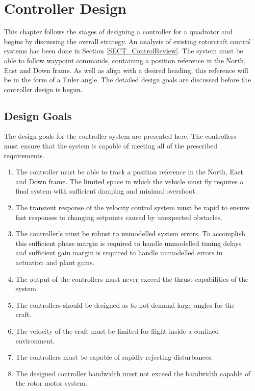 \chapter{Controller Design}
This chapter follows the stages of designing a controller for a quadrotor and begins by discussing the overall strategy. An analysis of existing rotorcraft control systems has been done in Section \ref{SECT_ControlReview}. The system must be able to follow waypoint commands, containing a position reference in the North, East and Down frame. As well as align with a desired heading, this reference will be in the form of a Euler angle. The detailed design goals are discussed before the controller design is begun.

\section{Design Goals}
The design goals for the controller system are presented here. The controllers must ensure that the system is capable of meeting all of the prescribed requirements.

\begin{enumerate}
	\item The controller must be able to track a position reference in the North, East and Down frame. The limited space in which the vehicle must fly requires a final system with sufficient damping and minimal overshoot.
	\item The transient response of the velocity control system must be rapid to ensure fast responses to changing setpoints caused by unexpected obstacles.
	\item The controller's must be robust to unmodelled system errors. To accomplish this sufficient phase margin is required to handle unmodelled timing delays and sufficient gain margin is required to handle unmodelled errors in actuation and plant gains.
	\item The output of the controllers must never exceed the thrust capabilities of the system. 
	\item The controllers should be designed as to not demand large angles for the craft.
	\item The velocity of the craft must be limited for flight inside a confined environment.
	\item The controllers must be capable of rapidly rejecting disturbances.
	\item The designed controller bandwidth must not exceed the bandwidth capable of the rotor motor system.
\end{enumerate}

